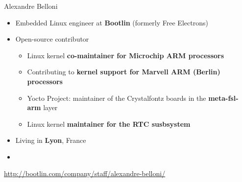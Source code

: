 \begin{frame}{Alexandre Belloni}
    \begin{itemize}
      \item Embedded Linux engineer at {\bf Bootlin} (formerly Free
            Electrons)
      \item Open-source contributor
        \begin{itemize}
          \item Linux kernel {\bf co-maintainer for Microchip ARM
            processors}
          \item Contributing to {\bf kernel support for Marvell
            ARM (Berlin) processors}
          \item Yocto Project: maintainer of the Crystalfontz boards
            in the {\bf meta-fsl-arm} layer
          \item Linux kernel {\bf maintainer for the RTC susbsystem}
        \end{itemize}
      \item Living in {\bf Lyon}, France
      \item {}
    \end{itemize}
    {\small \url{http://bootlin.com/company/staff/alexandre-belloni/}}
\end{frame}

